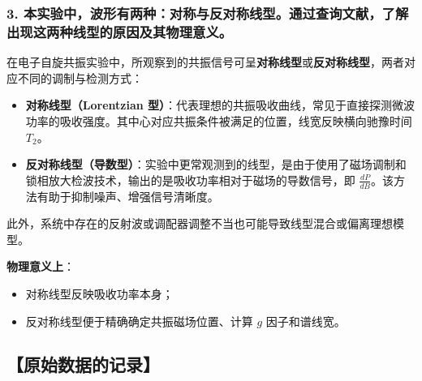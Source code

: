 \documentclass[12pt,a4paper,UTF8]{ctexart}
\begin{document}
\subsubsection*{3. 本实验中，波形有两种：对称与反对称线型。通过查询文献，了解出现这两种线型的原因及其物理意义。}

在电子自旋共振实验中，所观察到的共振信号可呈\textbf{对称线型}或\textbf{反对称线型}，两者对应不同的调制与检测方式：

\begin{itemize}
  \item \textbf{对称线型（Lorentzian 型）}：代表理想的共振吸收曲线，常见于直接探测微波功率的吸收强度。其中心对应共振条件被满足的位置，线宽反映横向驰豫时间 \(T_2\)。
  
  \item \textbf{反对称线型（导数型）}：实验中更常观测到的线型，是由于使用了磁场调制和锁相放大检波技术，输出的是吸收功率相对于磁场的导数信号，即 \(\frac{dP}{dB}\)。该方法有助于抑制噪声、增强信号清晰度。
\end{itemize}

此外，系统中存在的反射波或调配器调整不当也可能导致线型混合或偏离理想模型。

\textbf{物理意义上}：
\begin{itemize}
  \item 对称线型反映吸收功率本身；
  \item 反对称线型便于精确确定共振磁场位置、计算 \(g\) 因子和谱线宽。
\end{itemize}



\subsection*{【原始数据的记录】}

\end{document}
